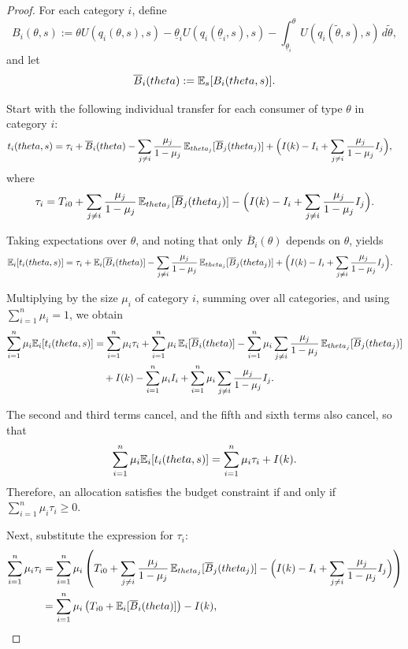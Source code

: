 \documentclass[master.tex]{subfiles}
\begin{document}
\begin{proof}

For each category $i$, define
\[
B_i(\theta,s)
:=
\theta U\!\left(q_i(\theta,s),s\right)
- \underline\theta_i U\!\left(q_i(\underline\theta_i,s),s\right)
- \int_{\underline{\theta}_i}^{\theta}
U\!\left(q_i(\tilde\theta,s),s\right)\,d\tilde\theta,
\]
and let
\[
\overline{B}_i(theta)
:=
\mathbb{E}_s[B_i(theta,s)].
\]

Start with the following individual transfer for each consumer of type $\theta$ in category $i$:
\begin{align*}
t_i(theta,s)
&=
\tau_i
+ \overline{B}_i(theta)
- \sum_{j\neq i}  \frac{\mu_j}{1-\mu_j}\,
   \mathbb{E}_{theta_j}[\overline{B}_j(theta_j)] + \Big(I(k) -I_i+\sum_{j\neq i}  \frac{\mu_j}{1-\mu_j}I_j\Big),
\end{align*}
where
\[
\tau_i
=
T_{i0}
+\sum_{j\neq i}  \frac{\mu_j}{1-\mu_j}\,
   \mathbb{E}_{theta_j}[\overline{B}_j(theta_j)]
- \Big(I(k) -I_i+\sum_{j\neq i}  \frac{\mu_j}{1-\mu_j}I_j\Big).
\]

Taking expectations over $\theta$, and noting that only $\overline{B}_i(\theta)$ depends on $\theta$, yields
\begin{align*}
\mathbb{E}_i[t_i(theta,s)]
&=
\tau_i
+ \mathbb{E}_i[\overline{B}_i(theta)]
- \sum_{j\neq i}  \frac{\mu_j}{1-\mu_j}\,
   \mathbb{E}_{theta_j}[\overline{B}_j(theta_j)] 
+ \Big(I(k) -I_i+\sum_{j\neq i}  \frac{\mu_j}{1-\mu_j}I_j\Big).
\end{align*}

Multiplying by the size $\mu_i$ of category $i$, summing over all categories, and using $\sum_{i=1}^n\mu_i = 1$, we obtain
\begin{align*}
\sum_{i=1}^n \mu_i\mathbb{E}_i[t_i(theta,s)]
&=
\sum_{i=1}^n \mu_i \tau_i
+ \sum_{i=1}^n\mu_i\,\mathbb{E}_i[\overline{B}_i(theta)]-\sum_{i=1}^n\mu_i\sum_{j\neq i} \frac{\mu_j}{1-\mu_j}\,
   \mathbb{E}_{theta_j}[\overline{B}_j(theta_j)]
\\
&\quad
+ I(k)
-\sum_{i=1}^n\mu_iI_i
+\sum_{i=1}^n\mu_i\sum_{j\neq i}  \frac{\mu_j}{1-\mu_j}I_j.
\end{align*}

The second and third terms cancel, and the fifth and sixth terms also cancel, so that
\[
\sum_{i=1}^n \mu_i\mathbb{E}_i[t_i(theta,s)]
=
\sum_{i=1}^n \mu_i \tau_i + I(k).
\]
Therefore, an allocation satisfies the budget constraint if and only if $\sum_{i=1}^n \mu_i \tau_i \geq 0$.

Next, substitute the expression for $\tau_i$:
\begin{align*}
\sum_{i=1}^n \mu_i \tau_i &= \sum_{i=1}^n \mu_i \left( T_{i0} + \sum_{j\neq i} \frac{\mu_j}{1-\mu_j}\, \mathbb{E}_{theta_j}[\overline{B}_j(theta_j)] - \Big(I(k) - I_i + \sum_{j\neq i} \frac{\mu_j}{1-\mu_j} I_j\Big) \right) \\
&= \sum_{i=1}^n \mu_i \left( T_{i0} + \mathbb{E}_i[\overline{B}_i(theta)] \right) - I(k),
\end{align*}


\end{proof}
\end{document}
